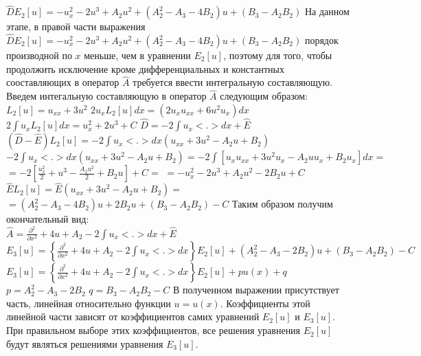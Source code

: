\documentclass[14pt,a4paper]{article}
\begin{document}
\newline
$\widehat{D} E_{2} [u] = -u_{x}^{2} - 2u^3 + A_{2}u^2 + (A_{2}^{2} - A_3 - 4B_2)u + (B_3 - A_{2}B_{2})$
\newline
На данном этапе, в правой части выражения $\widehat{D} E_{2} [u] = -u_{x}^{2} - 2u^3 + A_{2}u^2 + (A_{2}^{2} - A_3 - 4B_2)u + (B_3 - A_{2}B_{2})$ порядок производной по $x$ меньше, чем в уравнении $E_2 [u]$, поэтому для того, чтобы продолжить исключение кроме дифференциальных и константных сооставляющих в оператор $\widehat{A}$ требуется ввести интегральную составляющую.
\newline
Введем интегальную составляющую в оператор $\widehat{A}$ следующим образом: \\
$L_{2} [u] = u_{xx} + 3u^2$
\newline
$2u_{x}L_{2} [u] dx = (2u_{x}u_{xx} + 6u^2 u_{x})dx$
\newline
$2 \int u_{x} L_{2} [u] dx = u_{x}^{2} + 2u^3 + C$
\newline
$\widehat{D} = -2 \int u_{x} <.> dx + \widehat{E}$
\newline
$(\widehat{D} - \widehat{E})L_{2} [u] = -2 \int u_{x} <.> dx (u_{xx} + 3u^2 - A_{2} u + B_2)$
\newline
$-2 \int u_{x} <.> dx (u_{xx} + 3u^2 - A_{2} u + B_2) = -2 \int [u_{x}u_{xx} + 3u^2 u_x - A_2 u u_x + B_2 u_x]dx = $
$ = -2 [ \frac{u_{x}^{2}}{2} + u^3 - \frac{A_2 u^2}{2} + B_2 u] + C = $
$ = -u_{x}^{2} - 2u^3 + A_{2} u^2 - 2B_{2} u + C$
\newline
$\widehat{E}L_{2} [u] = \widehat{E} (u_{xx} + 3u^2 - A_2 u + B_2) = $
$ = (A_{2}^{2} - A_{3} - 4B_2)u + 2B_2 u + (B_3 - A_2 B_2) - C$
Таким образом получим окончательный вид: \\
$\widehat{A} = \frac{\partial^2}{\partial x^2} + 4u + A_{2} - 2 \int u_x <.> dx + \widehat{E}$
\newline
$E_3 [u] = \left\lbrace \frac{\partial^2}{\partial x^2} + 4u + A_{2} - 2 \int u_x <.> dx \right\rbrace E_2 [u] + (A_{2}^{2} - A_{3} - 2B_2)u + (B_3 - A_2 B_2) - C$
\newline
$E_3 [u] = \left\lbrace \frac{\partial^2}{\partial x^2} + 4u + A_{2} - 2 \int u_x <.> dx \right\rbrace E_2 [u] +
pu(x) + q$
\newline
$p = A_{2}^{2} - A_{3} - 2B_2$
\newline
$q = B_3 - A_2 B_2 - C$
\newline
В полученном выражении присутствует часть, линейная относительно функции $u = u(x)$. Коэффициенты этой линейной части зависят от коэффициентов самих уравнений $E_2 [u] $ и $E_3 [u]$. При правильном выборе этих коэффициентов, все решения уравнения $E_2 [u] $ будут являться решениями уравнения $E_3 [u]$.
\newline
\end{document}
